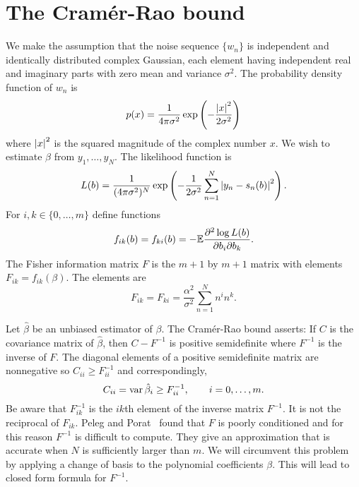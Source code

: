 \documentclass[journal,10pt]{IEEEtran}
\begin{document}
\section{The Cram\'{e}r-Rao bound} \label{sec_crb}

We make the assumption that the noise sequence $\{ w_n \}$ is independent and identically distributed complex Gaussian, each element having independent real and imaginary parts with zero mean and variance $\sigma^2$.  The probability density function of $w_n$ is 
\[
p(x) = \frac{1}{4 \pi \sigma^2} \exp\left( -\frac{{\left| x \right|}^2}{2\sigma^2} \right)
\]
where ${\left| x \right|}^2$ is the squared magnitude of the complex number $x$.  We wish to estimate $\beta$ from $y_1, \dots, y_N$.  The likelihood function is
\[
L(b) =  \frac{1}{(4 \pi \sigma^2)^N} \exp\left( - \frac{1}{2\sigma^{2}} \sum_{n=1}^N {\left| y_n -  s_n(b)  \right|}^2 \right).
\]
For $i,k \in \{0, \dots, m\}$ define functions 
\[
f_{ik}(b) = f_{ki}(b) = -{\mathbb E} \frac{ \partial^2 \log L(b) }{ \partial b_{i} \partial b_{k}}.
\]  
The Fisher information matrix $F$ is the $m+1$ by $m+1$ matrix with elements $F_{i k} = f_{ik}(\beta)$.  The elements are
\[
F_{ik} = F_{ki} = \frac{\alpha^2}{\sigma^2}\sum_{n=1}^{N} n^{i}n^{k}.
\]

Let $\hat{\beta}$ be an unbiased estimator of $\beta$.  The Cram\'{e}r-Rao bound asserts:  If $C$ is the covariance matrix of $\hat{\beta}$, then $C - F^{-1}$ is positive semidefinite where $F^{-1}$ is the inverse of $F$.  The diagonal elements of a positive semidefinite matrix are nonnegative so $C_{ii} \geq F^{-1}_{ii}$ and correspondingly, 
\[
C_{ii} = \operatorname{var} \hat{\beta}_{i} \geq F_{ii}^{-1}, \qquad i=0,\dots,m.
\]  
Be aware that $F_{ik}^{-1}$ is the $ik$th element of the inverse matrix $F^{-1}$.  It is not the reciprocal of $F_{ik}$.  Peleg and Porat~\cite{Peleg1991_CRB_PPS_1991} found that $F$ is poorly conditioned and for this reason $F^{-1}$ is difficult to compute.  They give an approximation that is accurate when $N$ is sufficiently larger than $m$.  We will circumvent this problem by applying a change of basis to the polynomial coefficients $\beta$.  This will lead to closed form formula for $F^{-1}$.  
\end{document}
